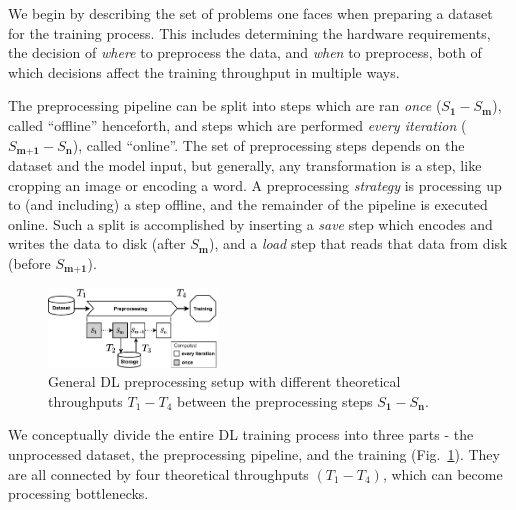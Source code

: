 We begin by describing the set of problems one faces when preparing a dataset for the training process.
This includes determining the hardware requirements, the decision of \textit{where} to preprocess the data, and \textit{when} to preprocess, both of which decisions affect the training throughput in multiple ways.

The preprocessing pipeline can be split into steps which are ran \textit{once} ($S_{\textbf{1}}-S_{\textbf{m}}$), called ``offline'' henceforth, and steps which are performed \textit{every iteration} ($S_{\textbf{m+1}}-S_{\textbf{n}}$), called ``online''.
The set of preprocessing steps depends on the dataset and the model input, but generally, any transformation is a step, like cropping an image or encoding a word.
A preprocessing \textit{strategy} is processing up to (and including) a step offline, and the remainder of the pipeline is executed online. Such a split is accomplished by inserting a \textit{save} step which encodes and writes the data to disk (after $S_\textbf{m}$), and a \textit{load} step that reads that data from disk (before $S_{\textbf{m+1}}$).

\begin{figure}[h]
  \includegraphics[width=0.4\textwidth]{figures/misc/generic-dl-pipeline-smaller.pdf}
  \vspace{-0.1cm}
  \caption{General DL preprocessing setup with different theoretical throughputs $T_{1}-T_{4}$ between the preprocessing steps $S_{\textbf{1}}-S_\textbf{n}$.}
  \label{fig:generic-dl-pipeline}
\end{figure}
\vspace{-0.2cm}

We conceptually divide the entire DL training process into three parts - the unprocessed dataset, the preprocessing pipeline, and the training (Fig.~\ref{fig:generic-dl-pipeline}).
They are all connected by four theoretical throughputs $(T_{1}-T_{4})$, which can become processing bottlenecks.

